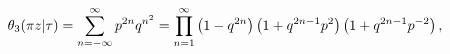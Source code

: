 \[\mathop{\theta_{3}\/}\nolimits\!\left(\pi z\middle|\tau\right)=\sum_{n=-\infty%
}^{\infty}p^{2n}q^{n^{2}}\\
=\prod_{n=1}^{\infty}\left(1-q^{2n}\right)\left(1+q^{2n-1}p^{2}\right)\left(1+%
q^{2n-1}p^{-2}\right),\]